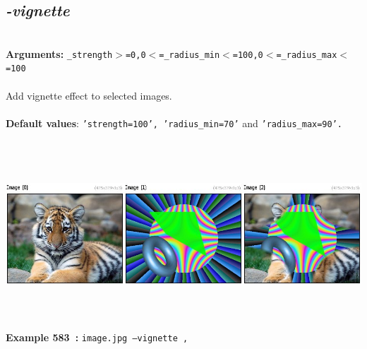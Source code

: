 \documentclass[a4paper,11pt,twoside]{book}
\begin{document}
\subsection{\emph{-vignette} }\vspace*{-0.5em}
~\\\textbf{Arguments: } 
{\small \texttt{\_strength$>$=0,0$<$=\_radius\_min$<$=100,0$<$=\_radius\_max$<$=100}}\\~\\
Add vignette effect to selected images.
~\\~\\\textbf{Default values}: {\small \texttt{'strength=100', 'radius\_min=70'} and \texttt{'radius\_max=90'.}}
\begin{center}\includegraphics[keepaspectratio=true,height=7cm,width=\textwidth]{img/gmic_def583.jpg}\\
{\footnotesize \textbf{Example 583~:} \texttt{image.jpg --vignette ,}}
\end{center}
\end{document}
